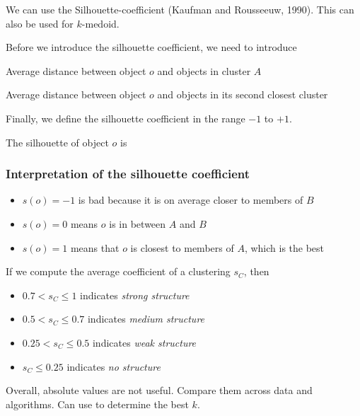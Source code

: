     We can use the Silhouette-coefficient (Kaufman and Rousseeuw, 1990). This can also be used for $k$-medoid. 

    Before we introduce the silhouette coefficient, we need to introduce
    
    \begin{defi}{Average distance between object $o$ and objects in cluster $A$}
    \end{defi}
  
   \begin{defi}
     Average distance between object $o$ and objects in its second closest cluster
   \end{defi}
    Finally, we define the silhouette coefficient in the range $-1$ to $+1$. 
    \begin{defi}
      The silhouette of object $o$ is 
    \end{defi}
    
\subsubsection{Interpretation of the silhouette coefficient}
\begin{itemize}
    \item $s(o) = -1$ is bad because it is on average closer to members of $B$
    \item $s(o) = 0$ means $o$ is in between $A$ and $B$
    \item $s(o) = 1$ means that $o$ is closest to members of $A$, which is the best
\end{itemize}
If we compute the average coefficient of a clustering $s_C$, then
    \begin{itemize}
        \item $0.7 < s_C \leq 1$ indicates \emph{strong structure}
        \item $0.5 < s_C \leq 0.7$ indicates \emph{medium structure}
        \item $0.25 < s_C \leq 0.5$ indicates \emph{weak structure}
        \item $s_C \leq 0.25$ indicates \emph{no structure}
    \end{itemize}
    Overall, absolute values are not useful. Compare them across data and algorithms. Can use to determine the best $k$.

